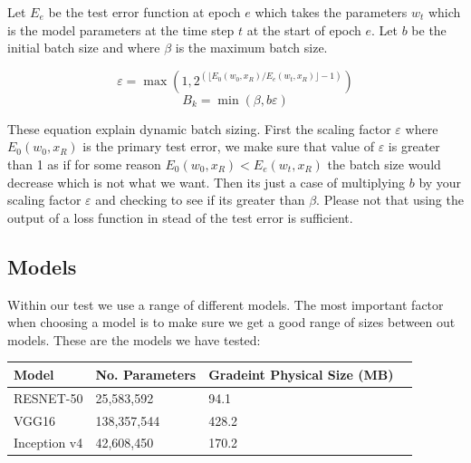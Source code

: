 \documentclass[11pt]{article}
\begin{document}
Let $E_e$ be the test error function at epoch $e$ which takes the parameters $w_t$ which is the model parameters at the time step $t$ at the start of epoch $e$. Let $b$ be the initial batch size and where      $\beta$ is the maximum batch size.  

\begingroup
\Large
$$
\varepsilon = \max \left(1, 2^{(\lfloor E_0(w_0,x_R)/E_e(w_t, x_R) \rfloor -1)} \right)
$$
$$
B_k = \min \left(\beta,b\varepsilon\right)
$$
\endgroup

These equation explain dynamic batch sizing. First the scaling factor $\varepsilon$ where $E_0(w_0,x_R)$ is the primary test error, we make sure that value of $\varepsilon$ is greater than 1 as if for some reason $E_0(w_0,x_R) < E_e(w_t, x_R)$ the batch size would decrease which is not what we want. Then its just a case of multiplying $b$ by your scaling factor $\varepsilon$ and checking to see if its greater than $\beta$. Please not that using the output of a loss function in stead of the test error is sufficient.


\subsection{Models}
Within our test we use a range of different models. The most important factor when choosing a model is to make sure we get a good range of sizes between out models. These are the models we have tested:

\begin{center}
\begin{tabular}{| p{3cm} | p{3cm} | p{3cm} | p{3cm} |} 
\hline
Model & No. Parameters &  Gradeint Physical Size (MB)\\ \hline
RESNET-50 & 25,583,592 &  94.1 \\ \hline
VGG16 &  138,357,544 &  428.2 \\ \hline
Inception v4 & 42,608,450 &  170.2\\ \hline
\end{tabular}
\end{center}
\end{document}
